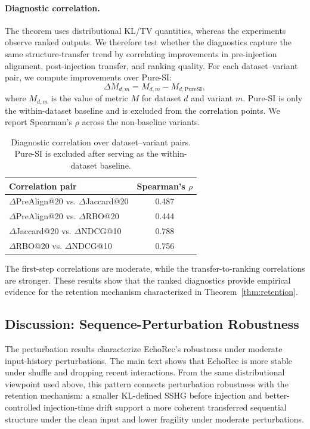 ﻿\documentclass{article}
\begin{document}
\paragraph{Diagnostic correlation.}
The theorem uses distributional KL/TV quantities, whereas the experiments observe ranked outputs. We therefore test whether the diagnostics capture the same structure-transfer trend by correlating improvements in pre-injection alignment, post-injection transfer, and ranking quality. For each dataset--variant pair, we compute improvements over Pure-SI:
\begin{equation}
\Delta M_{d,m}=M_{d,m}-M_{d,\mathrm{PureSI}},
\end{equation}
where $M_{d,m}$ is the value of metric $M$ for dataset $d$ and variant $m$. Pure-SI is only the within-dataset baseline and is excluded from the correlation points. We report Spearman's $\rho$ across the non-baseline variants.

\begin{table}[!t]
\centering
\caption{Diagnostic correlation over dataset--variant pairs. Pure-SI is excluded after serving as the within-dataset baseline.}
\label{tab:diagnostic_correlation}
\small
\setlength{\tabcolsep}{7pt}
\renewcommand{\arraystretch}{1.06}
\begin{tabular}{lc}
\toprule
Correlation pair & Spearman's $\rho$ \\
\midrule
$\Delta$PreAlign@20 vs. $\Delta$Jaccard@20 & 0.487 \\
$\Delta$PreAlign@20 vs. $\Delta$RBO@20 & 0.444 \\
$\Delta$Jaccard@20 vs. $\Delta$NDCG@10 & 0.788 \\
$\Delta$RBO@20 vs. $\Delta$NDCG@10 & 0.756 \\
\bottomrule
\end{tabular}
\end{table}

The first-step correlations are moderate, while the transfer-to-ranking correlations are stronger. These results show that the ranked diagnostics provide empirical evidence for the retention mechanism characterized in Theorem~\ref{thm:retention}.
\subsection{Discussion: Sequence-Perturbation Robustness}
\label{app:perturb_cor}

The perturbation results characterize EchoRec's robustness under moderate input-history perturbations. The main text shows that EchoRec is more stable under shuffle and dropping recent interactions. From the same distributional viewpoint used above, this pattern connects perturbation robustness with the retention mechanism: a smaller KL-defined SSHG before injection and better-controlled injection-time drift support a more coherent transferred sequential structure under the clean input and lower fragility under moderate perturbations.
\end{document}

